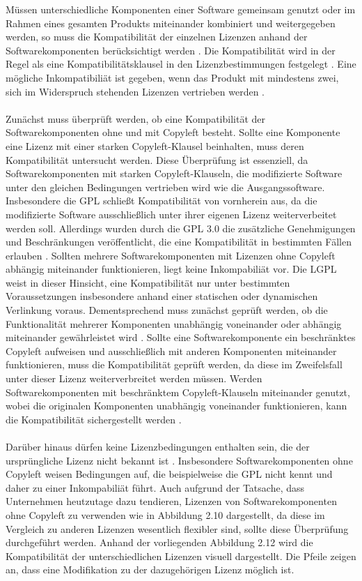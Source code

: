 Müssen unterschiedliche Komponenten einer Software gemeinsam genutzt oder im Rahmen eines gesamten Produkts miteinander kombiniert und weitergegeben werden, so muss die Kompatibilität der einzelnen Lizenzen anhand der Softwarekomponenten berücksichtigt werden \cite{gerlach_praxisprobleme_2006}. Die Kompatibilität wird in der Regel als eine Kompatibilitätsklausel in den Lizenzbestimmungen festgelegt \cite{gerlach_praxisprobleme_2006}. Eine mögliche Inkompatibiliät ist gegeben, wenn das Produkt mit mindestens zwei, sich im Widerspruch stehenden Lizenzen vertrieben werden \cite[S. 43]{bitkom_open_2016}.\\\\ Zunächst muss überprüft werden, ob eine Kompatibilität der Softwarekomponenten ohne und mit Copyleft besteht. Sollte eine Komponente eine Lizenz mit einer starken Copyleft-Klausel beinhalten, muss deren Kompatibilität untersucht werden. Diese Überprüfung ist essenziell, da Softwarekomponenten mit starken Copyleft-Klauseln, die modifizierte Software unter den gleichen Bedingungen vertrieben wird wie die Ausgangssoftware. Insbesondere die GPL schließt Kompatibilität von vornherein aus, da die modifizierte Software ausschließlich unter ihrer eigenen Lizenz weiterverbeitet werden soll. Allerdings wurden durch die GPL 3.0 die zusätzliche Genehmigungen und Beschränkungen veröffentlicht, die eine Kompatibilität in bestimmten Fällen erlauben \cite[S. 64]{schaaf_open-source-lizenzen_2013}. Sollten mehrere Softwarekomponenten mit Lizenzen ohne Copyleft abhängig miteinander funktionieren, liegt keine Inkompabiliät vor. Die LGPL weist in dieser Hinsicht, eine Kompatibilität nur unter bestimmten Voraussetzungen insbesondere anhand einer statischen oder dynamischen Verlinkung voraus. Dementsprechend muss zunächst geprüft werden, ob die Funktionalität mehrerer Komponenten unabhängig voneinander oder abhängig miteinander gewährleistet wird \cite[S. 44]{bitkom_open_2016}. Sollte eine Softwarekomponente ein beschränktes Copyleft aufweisen und ausschließlich mit anderen Komponenten miteinander funktionieren, muss die Kompatibilität geprüft werden, da diese im Zweifelsfall unter dieser Lizenz weiterverbreitet werden müssen. Werden Softwarekomponenten mit beschränktem Copyleft-Klauseln miteinander genutzt, wobei die originalen Komponenten unabhängig voneinander funktionieren, kann die Kompatibilität sichergestellt werden \cite[S. 44]{bitkom_open_2016}.\\\\ Darüber hinaus dürfen keine Lizenzbedingungen enthalten sein, die der ursprüngliche Lizenz nicht bekannt ist \cite[S. 64]{schaaf_open-source-lizenzen_2013}. Insbesondere Softwarekomponenten ohne Copyleft weisen Bedingungen auf, die beispielweise die GPL nicht kennt und daher zu einer Inkompabiliät führt. Auch aufgrund der Tatsache, dass Unternehmen heutzutage dazu tendieren, Lizenzen von Softwarekomponenten ohne Copyleft zu verwenden wie in Abbildung 2.10 dargestellt, da diese im Vergleich zu anderen Lizenzen wesentlich flexibler sind, sollte diese Überprüfung durchgeführt werden. Anhand der vorliegenden Abbildung 2.12 wird die Kompatibilität der unterschiedlichen Lizenzen visuell dargestellt. Die Pfeile zeigen an, dass eine Modifikation zu der dazugehörigen Lizenz möglich ist. 

